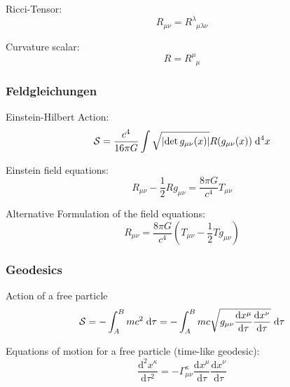 			\noindent
			Ricci-Tensor:
			\begin{equation}
				R_{\mu\nu} = R^\lambda_{\phantom{\lambda}\mu\lambda\nu}
			\end{equation}

			\noindent
			Curvature scalar:
			\begin{equation}
				R = R^\mu_{\phantom{\mu}\mu}
			\end{equation}

		\subsubsection{Feldgleichungen}
			\noindent
			Einstein-Hilbert Action:
			\begin{equation}
				\mathcal{S} = \frac{c^4}{16\pi G} \int \sqrt{\left|\det{g_{\mu\nu}(x)}\right|} R(g_{\mu\nu}(x))\;\mathrm{d}^4 x
			\end{equation}

			\noindent
			Einstein field equations:
			\begin{equation}
				R_{\mu\nu} - \frac{1}{2} R g_{\mu\nu} = \frac{8\pi G}{c^4} T_{\mu\nu}
			\end{equation}

			\noindent
			Alternative Formulation of the field equations:
			\begin{equation}
				R_{\mu\nu} = \frac{8\pi G}{c^4} \left( T_{\mu\nu} - \frac{1}{2} T g_{\mu\nu} \right)
			\end{equation}


		\subsubsection{Geodesics}
			\noindent
			Action of a free particle%
			\begin{equation}
				\mathcal{S} = -\int_A^B mc^2\;\mathrm{d} \tau = -\int_A^B mc\sqrt{g_{\mu\nu} \frac{\mathrm{d} x^\mu}{\mathrm{d} \tau} \frac{\mathrm{d} x^\nu}{\mathrm{d} \tau}} \;\mathrm{d} \tau
			\end{equation}

			\noindent
			Equations of motion for a free particle (time-like geodesic):%
			\begin{equation}
				\frac{\mathrm{d}^2 x^\kappa}{\mathrm{d}\tau^2}=-\Gamma_{\mu\nu}^{\kappa}\frac{\mathrm{d}x^\mu}{\mathrm{d}\tau}\frac{\mathrm{d}x^\nu}{\mathrm{d}\tau}
			\end{equation}

